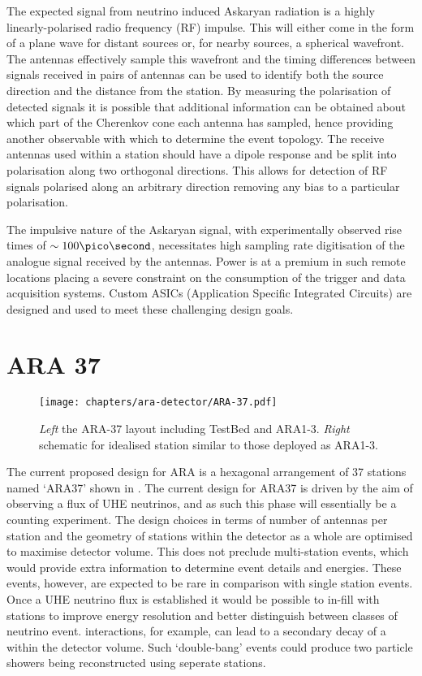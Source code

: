 The expected signal from neutrino induced Askaryan radiation is a highly linearly-polarised radio frequency (RF) impulse. This will either come in the form of a plane wave for distant sources or, for nearby sources, a spherical wavefront. The antennas effectively sample this wavefront and the timing differences between signals received in pairs of antennas can be used to identify both the source direction and the distance from the station. By measuring the polarisation of detected signals it is possible that additional information can be obtained about which part of the Cherenkov cone each antenna has sampled, hence providing another observable with which to determine the event topology. The receive antennas used within a station should have a dipole response and be split into polarisation along two orthogonal directions. This allows for detection of RF signals polarised along an arbitrary direction removing any bias to a particular polarisation.

The impulsive nature of the Askaryan signal, with experimentally observed rise times of $\sim 100 \pico \second$, necessitates high sampling rate digitisation of the analogue signal received by the antennas. Power is at a premium in such remote locations placing a severe constraint on the consumption of the trigger and data acquisition systems. Custom ASICs (Application Specific Integrated Circuits) are designed and used to meet these challenging design goals.



\section{ARA 37}
\label{sec:ara-detector:ARA37}

\begin{figure}[htpb]
  \centering
  \texttt{[image: chapters/ara-detector/ARA-37.pdf]}
  \caption{\textit{Left} the ARA-37 layout including TestBed and ARA1-3. \textit{Right} schematic for idealised station similar to those deployed as ARA1-3.}
  \label{fig:ara-detector:ARA-37:ARA-37}
\end{figure}

The current proposed design for ARA is a hexagonal arrangement of 37 stations named `ARA37' shown in . The current design for ARA37 is driven by the aim of observing a flux of UHE neutrinos, and as such this phase will essentially be a counting experiment. The design choices in terms of number of antennas per station and the geometry of stations within the detector as a whole are optimised to maximise detector volume. This does not preclude multi-station events, which would provide extra information to determine event details and energies. These events, however, are expected to be rare in comparison with single station events. Once a UHE neutrino flux is established it would be possible to in-fill with stations to improve energy resolution and better distinguish between classes of neutrino event. \Pnut interactions, for example, can lead to a secondary decay of a \Ptau within the detector volume. Such `double-bang' events could produce two particle showers being reconstructed using seperate stations.



